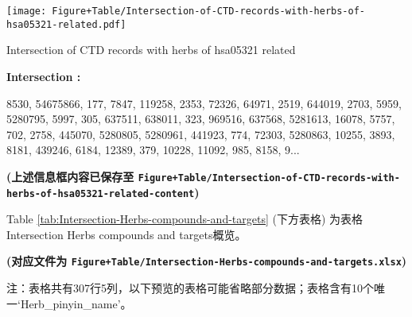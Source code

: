 \documentclass[
]{article}
\begin{document}
\def\@captype{figure}
\begin{center}
\texttt{[image: Figure+Table/Intersection-of-CTD-records-with-herbs-of-hsa05321-related.pdf]}
\caption{Intersection of CTD records with herbs of hsa05321 related}\label{fig:Intersection-of-CTD-records-with-herbs-of-hsa05321-related}
\end{center}
\begin{center}\begin{tcolorbox}[colback=gray!10, colframe=gray!50, width=0.9\linewidth, arc=1mm, boxrule=0.5pt]
\textbf{
Intersection
:}

\vspace{0.5em}

    8530, 54675866, 177, 7847, 119258, 2353, 72326, 64971,
2519, 644019, 2703, 5959, 5280795, 5997, 305, 637511,
638011, 323, 969516, 637568, 5281613, 16078, 5757, 702,
2758, 445070, 5280805, 5280961, 441923, 774, 72303,
5280863, 10255, 3893, 8181, 439246, 6184, 12389, 379,
10228, 11092, 985, 8158, 9...

\vspace{2em}
\end{tcolorbox}
\end{center}

\textbf{(上述信息框内容已保存至 \texttt{Figure+Table/Intersection-of-CTD-records-with-herbs-of-hsa05321-related-content})}

Table \ref{tab:Intersection-Herbs-compounds-and-targets} (下方表格) 为表格Intersection Herbs compounds and targets概览。

\textbf{(对应文件为 \texttt{Figure+Table/Intersection-Herbs-compounds-and-targets.xlsx})}

\begin{center}\begin{tcolorbox}[colback=gray!10, colframe=gray!50, width=0.9\linewidth, arc=1mm, boxrule=0.5pt]注：表格共有307行5列，以下预览的表格可能省略部分数据；表格含有10个唯一`Herb\_pinyin\_name'。
\end{tcolorbox}
\end{center}
\end{document}
